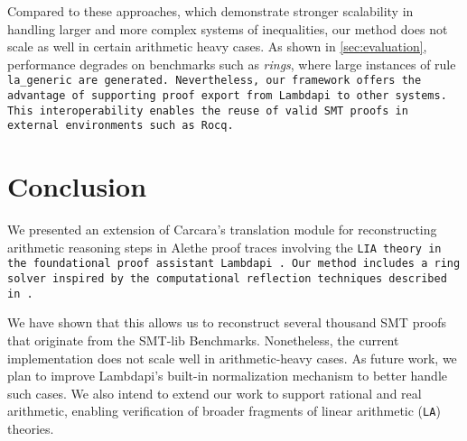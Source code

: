 \documentclass[runningheads]{llncs}
\begin{document}
Compared to these approaches, which demonstrate stronger scalability in handling larger and more complex systems of inequalities, our method does not scale as well in certain arithmetic heavy cases.
As shown in \cref{sec:evaluation}, performance degrades on benchmarks such as \emph{rings}, where large instances of rule \tt{la\_generic} are generated.
Nevertheless, our framework offers the advantage of supporting proof export from Lambdapi to other systems. This interoperability enables the reuse of valid SMT proofs in external environments such as Rocq.


\section{Conclusion}
\label{sec:conclusion}

We presented an extension of Carcara's \cite{carcara} translation module \cite{ColtellacciMD24} for reconstructing arithmetic reasoning steps in Alethe proof traces involving the \tt{LIA} theory in the foundational proof assistant Lambdapi \cite{lambdapi}.
Our method includes a ring solver inspired by the computational reflection techniques described in \cite{reflection-origin-coq,ring-coq}.

We have shown that this allows us to reconstruct several thousand SMT proofs that originate from the SMT-lib Benchmarks.
Nonetheless, the current implementation does not scale well in arithmetic-heavy cases.
As future work, we plan to improve Lambdapi’s built-in normalization mechanism to better handle such cases.
We also intend to extend our work to support rational and real arithmetic, enabling verification of broader fragments of linear arithmetic (\texttt{LA}) theories.





\end{document}
